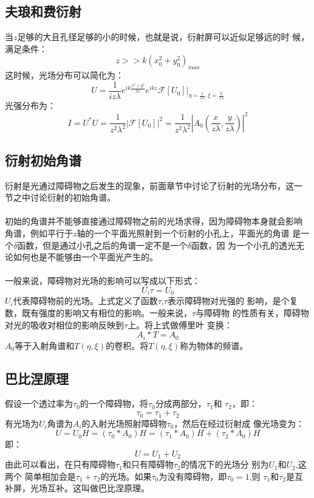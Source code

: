 \documentclass{article}
\begin{document}
\subsection{夫琅和费衍射}
当$z$足够的大且孔径足够的小的时候，也就是说，衍射屏可以近似足够远的时
候，满足条件：
\[z>>k(x_0^2+y_0^2)_{max}\]
这时候，光场分布可以简化为：
\[U=\frac{1}{iz\lambda}e^{ik
    \frac{x^2+y^2}{2z}}e^{ikz}\mathscr{F}[U_0]|_{\eta=\frac{x}{z\lambda},\xi=\frac{y}{z\lambda}}\]
光强分布为：
\begin{equation}
  \label{eq:7}
  I=U^{*}U=\frac{1}{z^2\lambda^2}|\mathscr{F}[U_0]|^2=\frac{1}{z^2\lambda^2}|A_0(\frac{x}{z\lambda},\frac{y}{z\lambda})|^2
\end{equation}
\subsection{衍射初始角谱}
衍射是光通过障碍物之后发生的现象，前面章节中讨论了衍射的光场分布，这一
节之中讨论衍射的初始角谱。
\paragraph{}
初始的角谱并不能够直接通过障碍物之前的光场求得，因为障碍物本身就会影响
角谱，例如平行于$z$轴的一个平面光照射到一个衍射的小孔上，平面光的角谱
是一个$\delta$函数，但是通过小孔之后的角谱一定不是一个$\delta$函数，因
为一个小孔的透光无论如何也是不能够由一个平面光产生的。
\paragraph{}
一般来说，障碍物对光场的影响可以写成以下形式：
\[U_i\tau=U_0 \]
$U_i$代表障碍物前的光场。上式定义了函数$\tau$,$\tau$表示障碍物对光强的
影响，是个复数，既有强度的影响又有相位的影响。一般来说，$\tau$与障碍物
的性质有关，障碍物对光的吸收对相位的影响反映到$\tau$上。将上式做傅里叶
变换：
\[A_i*T=A_0\]
$A_0$等于入射角谱和$T(\eta,\xi)$的卷积。将$T(\eta,\xi)$称为物体的频谱。
\subsection{巴比涅原理}
假设一个透过率为$\tau_0$的一个障碍物，将$\tau_0$分成两部分，$\tau_1$和
$\tau_2$，即：
\[\tau_0=\tau_1+\tau_2\]
有光场为$U_i$角谱为$A_i$的入射光场照射障碍物$\tau_0$，然后在经过衍射成
像光场变为：
\[U=U_0H=(\tau_0*A_0)H=(\tau_1*A_0)H+(\tau_2*A_0)H\]
即：
\[U=U_1+U_2\]
由此可以看出，在只有障碍物$\tau_1$和只有障碍物$\tau_2$的情况下的光场分
别为$U_1$和$U_2$,这两个
简单相加会是$\tau_1+\tau_2$的光场。如果$\tau_0$为没有障碍物，即$\tau_0=1$,则
$\tau_1$和$\tau_2$是互补屏，光场互补。这叫做巴比涅原理。
\end{document}
